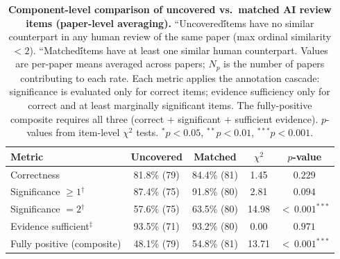 \begin{table}[t]
\centering
\fontsize{7.5}{10}\selectfont
\setlength{\tabcolsep}{3pt}
\begin{tabular}{l c c c c}
\toprule
\textbf{Metric} & \textbf{Uncovered} & \textbf{Matched} & $\chi^2$ & $p$-value \\
\midrule
Correctness & 81.8\% (79) & 84.4\% (81) & 1.45 & $0.229$ \\
Significance $\geq 1$$^{\dagger}$ & 87.4\% (75) & 91.8\% (80) & 2.81 & $0.094$ \\
Significance $= 2$$^{\dagger}$ & 57.6\% (75) & 63.5\% (80) & 14.98 & ${<}\,0.001^{***}$ \\
Evidence sufficient$^{\ddagger}$ & 93.5\% (71) & 93.2\% (80) & 0.00 & $0.971$ \\
\midrule
Fully positive (composite) & 48.1\% (79) & 54.8\% (81) & 13.71 & ${<}\,0.001^{***}$ \\
\bottomrule
\end{tabular}
\caption{\textbf{Component-level comparison of uncovered vs.\ matched AI review items (paper-level averaging).}
``Uncovered\'\' items have no similar counterpart in any human review of the same paper (max ordinal similarity $< 2$).
``Matched\'\' items have at least one similar human counterpart.
Values are per-paper means averaged across papers; $N_p$ is the number of papers contributing to each rate.
Each metric applies the annotation cascade: significance is evaluated only for correct items;
evidence sufficiency only for correct and at least marginally significant items.
The fully-positive composite requires all three (correct + significant + sufficient evidence).
$p$-values from item-level $\chi^2$ tests.
$^{*}p < 0.05$, $^{**}p < 0.01$, $^{***}p < 0.001$.}
\label{tab:uncovered-components}
\end{table}